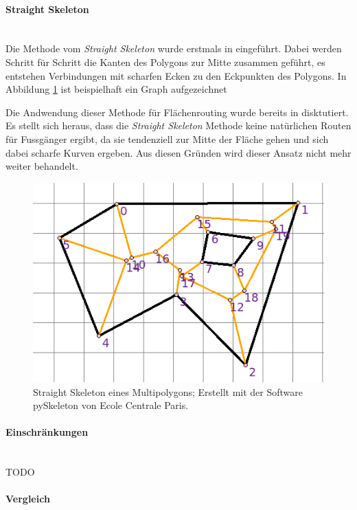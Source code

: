 \paragraph{Straight Skeleton}~\\

Die Methode vom \emph{Straight Skeleton} wurde erstmals in \cite{aichholzer_skeleton} eingeführt. Dabei werden Schritt für Schritt die Kanten des Polygons zur Mitte zusammen geführt, es entstehen Verbindungen mit scharfen Ecken zu den Eckpunkten des Polygons. In Abbildung \ref{fig:skeleton_example} ist beispielhaft ein Graph aufgezeichnet

Die Andwendung dieser Methode für Flächenrouting wurde bereits in \cite{graser_visibility_graph} disktutiert. Es stellt sich heraus, dass die \emph{Straight Skeleton} Methode keine natürlichen Routen für Fussgänger ergibt, da sie tendenziell zur Mitte der Fläche gehen und sich dabei scharfe Kurven ergeben. Aus diesen Gründen wird dieser Ansatz nicht mehr weiter behandelt.

\begin{figure}[th]
\centering
\includegraphics[width=0.7\linewidth]{technicalreport/img/skeleton_example.png}
\caption[Straight Skeleton Beispiel]{Straight Skeleton eines Multipolygons; Erstellt mit der Software pySkeleton von Ecole Centrale Paris.}
\label{fig:skeleton_example}
\end{figure}

\paragraph{Einschränkungen}~\\

TODO

\paragraph{Vergleich}~\\

